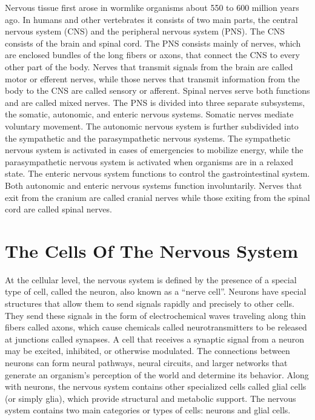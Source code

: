 Nervous tissue first arose in wormlike organisms about 550 to 600 million years ago. In humans and other vertebrates it consists of two main parts, the central nervous system (CNS) and the peripheral nervous system (PNS). The CNS consists of the brain and spinal cord. The PNS consists mainly of nerves, which are enclosed bundles of the long fibers or axons, that connect the CNS to every other part of the body. Nerves that transmit signals from the brain are called motor or efferent nerves, while those nerves that transmit information from the body to the CNS are called sensory or afferent. Spinal nerves serve both functions and are called mixed nerves. The PNS is divided into three separate subsystems, the somatic, autonomic, and enteric nervous systems. Somatic nerves mediate voluntary movement. The autonomic nervous system is further subdivided into the sympathetic and the parasympathetic nervous systems. The sympathetic nervous system is activated in cases of emergencies to mobilize energy, while the parasympathetic nervous system is activated when organisms are in a relaxed state. The enteric nervous system functions to control the gastrointestinal system. Both autonomic and enteric nervous systems function involuntarily. Nerves that exit from the cranium are called cranial nerves while those exiting from the spinal cord are called spinal nerves.

\hypertarget{the-cells-of-the-nervous-system}{%
\section{The Cells Of The Nervous System}\label{the-cells-of-the-nervous-system}}

At the cellular level, the nervous system is defined by the presence of a special type of cell, called the neuron, also known as a ``nerve cell''. Neurons have special structures that allow them to send signals rapidly and precisely to other cells. They send these signals in the form of electrochemical waves traveling along thin fibers called axons, which cause chemicals called neurotransmitters to be released at junctions called synapses. A cell that receives a synaptic signal from a neuron may be excited, inhibited, or otherwise modulated. The connections between neurons can form neural pathways, neural circuits, and larger networks that generate an organism's perception of the world and determine its behavior. Along with neurons, the nervous system contains other specialized cells called glial cells (or simply glia), which provide structural and metabolic support.
The nervous system contains two main categories or types of cells: neurons and glial cells.

